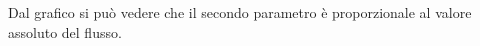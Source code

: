 %     

      Dal grafico si pu\`o vedere che il secondo parametro \`e proporzionale al valore assoluto del flusso. 

